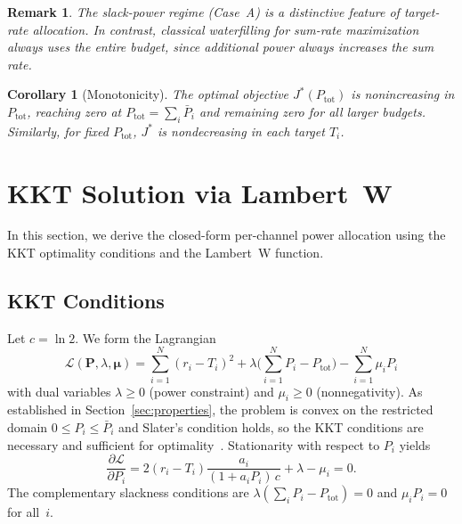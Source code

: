 \documentclass[journal]{IEEEtran}
\newtheorem{corollary}{Corollary}
\newtheorem{remark}{Remark}
\begin{document}
\begin{remark}
The slack-power regime (Case~A) is a distinctive feature of target-rate allocation.
In contrast, classical waterfilling for sum-rate maximization always uses the entire budget, since additional power always increases the sum rate.
\end{remark}

\begin{corollary}[Monotonicity]
\label{cor:monotone}
The optimal objective $J^*(P_{\mathrm{tot}})$ is nonincreasing in $P_{\mathrm{tot}}$, reaching zero at $P_{\mathrm{tot}} = \sum_i \bar{P}_i$ and remaining zero for all larger budgets.
Similarly, for fixed $P_{\mathrm{tot}}$, $J^*$ is nondecreasing in each target $T_i$.
\end{corollary}

\section{KKT Solution via Lambert~W}
\label{sec:kkt}

In this section, we derive the closed-form per-channel power allocation using the KKT optimality conditions and the Lambert~W function.

\subsection{KKT Conditions}

Let $c = \ln 2$.
We form the Lagrangian
\begin{equation}
\mathcal{L}(\bm{P},\lambda,\bm{\mu}) = \sum_{i=1}^{N}(r_i - T_i)^2 + \lambda\Big(\sum_{i=1}^{N} P_i - P_{\mathrm{tot}}\Big) - \sum_{i=1}^{N} \mu_i P_i
\end{equation}
with dual variables $\lambda \ge 0$ (power constraint) and $\mu_i \ge 0$ (nonnegativity).
As established in Section~\ref{sec:properties}, the problem is convex on the restricted domain $0 \le P_i \le \bar{P}_i$ and Slater's condition holds, so the KKT conditions are necessary and sufficient for optimality~\cite{boyd2004convex}.
Stationarity with respect to $P_i$ yields
\begin{equation}
\frac{\partial \mathcal{L}}{\partial P_i} = 2(r_i - T_i)\frac{a_i}{(1+a_iP_i)\,c} + \lambda - \mu_i = 0.
\label{eq:stationary}
\end{equation}
The complementary slackness conditions are $\lambda(\sum_i P_i - P_{\mathrm{tot}}) = 0$ and $\mu_i P_i = 0$ for all~$i$.
\end{document}
